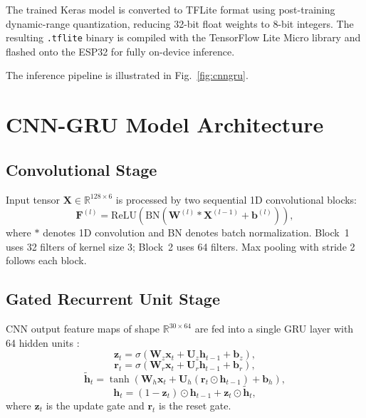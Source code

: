 \documentclass[conference]{IEEEtran}
\begin{document}
The trained Keras model is converted to TFLite format using post-training dynamic-range quantization, reducing 32-bit float weights to 8-bit integers. The resulting \texttt{.tflite} binary is compiled with the TensorFlow Lite Micro library and flashed onto the ESP32 for fully on-device inference.

The inference pipeline is illustrated in Fig.~\ref{fig:cnngru}.

\section{CNN-GRU Model Architecture}

\subsection{Convolutional Stage}

Input tensor $\mathbf{X} \in \mathbb{R}^{128 \times 6}$ is processed by two sequential 1D convolutional blocks:
\begin{equation}
    \mathbf{F}^{(l)} = \text{ReLU}\left(\text{BN}\left(\mathbf{W}^{(l)} * \mathbf{X}^{(l-1)} + \mathbf{b}^{(l)}\right)\right),
\end{equation}
where $*$ denotes 1D convolution and BN denotes batch normalization. Block~1 uses 32 filters of kernel size 3; Block~2 uses 64 filters. Max pooling with stride 2 follows each block.

\subsection{Gated Recurrent Unit Stage}

CNN output feature maps of shape $\mathbb{R}^{30 \times 64}$ are fed into a single GRU layer with 64 hidden units \cite{b6}:
\begin{equation}
    \mathbf{z}_t = \sigma(\mathbf{W}_z \mathbf{x}_t + \mathbf{U}_z \mathbf{h}_{t-1} + \mathbf{b}_z),
\end{equation}
\begin{equation}
    \mathbf{r}_t = \sigma(\mathbf{W}_r \mathbf{x}_t + \mathbf{U}_r \mathbf{h}_{t-1} + \mathbf{b}_r),
\end{equation}
\begin{equation}
    \tilde{\mathbf{h}}_t = \tanh\left(\mathbf{W}_h \mathbf{x}_t + \mathbf{U}_h (\mathbf{r}_t \odot \mathbf{h}_{t-1}) + \mathbf{b}_h\right),
\end{equation}
\begin{equation}
    \mathbf{h}_t = (1 - \mathbf{z}_t) \odot \mathbf{h}_{t-1} + \mathbf{z}_t \odot \tilde{\mathbf{h}}_t,
\end{equation}
where $\mathbf{z}_t$ is the update gate and $\mathbf{r}_t$ is the reset gate.
\end{document}

